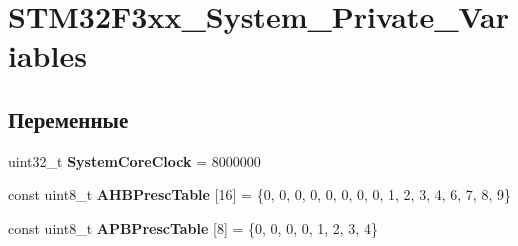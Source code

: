 \hypertarget{group___s_t_m32_f3xx___system___private___variables}{
\section{STM32F3xx\_\-System\_\-Private\_\-Variables}
\label{group___s_t_m32_f3xx___system___private___variables}
}
\subsection*{Переменные}
\begin{CompactItemize}
\item 
\hypertarget{group___s_t_m32_f3xx___system___private___variables_ga3cd3e43291e81e795d642b79b6088e6}{
uint32\_\-t \textbf{SystemCoreClock} = 8000000}
\label{group___s_t_m32_f3xx___system___private___variables_ga3cd3e43291e81e795d642b79b6088e6}

\item 
\hypertarget{group___s_t_m32_f3xx___system___private___variables_g6e1d9cd666f0eacbfde31e9932a93466}{
const uint8\_\-t \textbf{AHBPrescTable} \mbox{[}16\mbox{]} = \{0, 0, 0, 0, 0, 0, 0, 0, 1, 2, 3, 4, 6, 7, 8, 9\}}
\label{group___s_t_m32_f3xx___system___private___variables_g6e1d9cd666f0eacbfde31e9932a93466}

\item 
\hypertarget{group___s_t_m32_f3xx___system___private___variables_g5b4f8b768465842cf854a8f993b375e9}{
const uint8\_\-t \textbf{APBPrescTable} \mbox{[}8\mbox{]} = \{0, 0, 0, 0, 1, 2, 3, 4\}}
\label{group___s_t_m32_f3xx___system___private___variables_g5b4f8b768465842cf854a8f993b375e9}

\end{CompactItemize}
